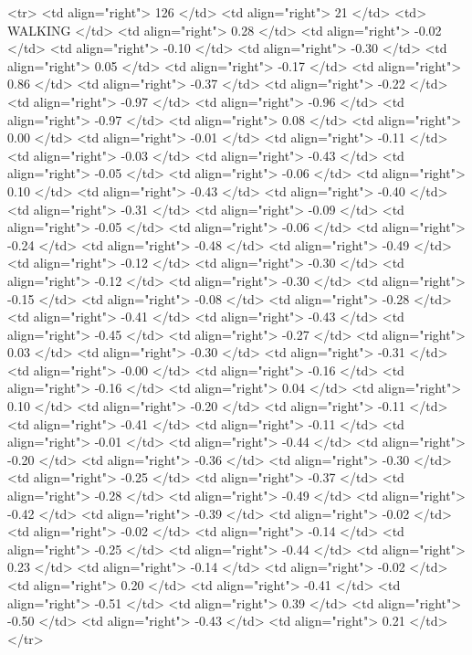   <tr> <td align="right"> 126 </td> <td align="right">  21 </td> <td> WALKING </td> <td align="right"> 0.28 </td> <td align="right"> -0.02 </td> <td align="right"> -0.10 </td> <td align="right"> -0.30 </td> <td align="right"> 0.05 </td> <td align="right"> -0.17 </td> <td align="right"> 0.86 </td> <td align="right"> -0.37 </td> <td align="right"> -0.22 </td> <td align="right"> -0.97 </td> <td align="right"> -0.96 </td> <td align="right"> -0.97 </td> <td align="right"> 0.08 </td> <td align="right"> 0.00 </td> <td align="right"> -0.01 </td> <td align="right"> -0.11 </td> <td align="right"> -0.03 </td> <td align="right"> -0.43 </td> <td align="right"> -0.05 </td> <td align="right"> -0.06 </td> <td align="right"> 0.10 </td> <td align="right"> -0.43 </td> <td align="right"> -0.40 </td> <td align="right"> -0.31 </td> <td align="right"> -0.09 </td> <td align="right"> -0.05 </td> <td align="right"> -0.06 </td> <td align="right"> -0.24 </td> <td align="right"> -0.48 </td> <td align="right"> -0.49 </td> <td align="right"> -0.12 </td> <td align="right"> -0.30 </td> <td align="right"> -0.12 </td> <td align="right"> -0.30 </td> <td align="right"> -0.15 </td> <td align="right"> -0.08 </td> <td align="right"> -0.28 </td> <td align="right"> -0.41 </td> <td align="right"> -0.43 </td> <td align="right"> -0.45 </td> <td align="right"> -0.27 </td> <td align="right"> 0.03 </td> <td align="right"> -0.30 </td> <td align="right"> -0.31 </td> <td align="right"> -0.00 </td> <td align="right"> -0.16 </td> <td align="right"> -0.16 </td> <td align="right"> 0.04 </td> <td align="right"> 0.10 </td> <td align="right"> -0.20 </td> <td align="right"> -0.11 </td> <td align="right"> -0.41 </td> <td align="right"> -0.11 </td> <td align="right"> -0.01 </td> <td align="right"> -0.44 </td> <td align="right"> -0.20 </td> <td align="right"> -0.36 </td> <td align="right"> -0.30 </td> <td align="right"> -0.25 </td> <td align="right"> -0.37 </td> <td align="right"> -0.28 </td> <td align="right"> -0.49 </td> <td align="right"> -0.42 </td> <td align="right"> -0.39 </td> <td align="right"> -0.02 </td> <td align="right"> -0.02 </td> <td align="right"> -0.14 </td> <td align="right"> -0.25 </td> <td align="right"> -0.44 </td> <td align="right"> 0.23 </td> <td align="right"> -0.14 </td> <td align="right"> -0.02 </td> <td align="right"> 0.20 </td> <td align="right"> -0.41 </td> <td align="right"> -0.51 </td> <td align="right"> 0.39 </td> <td align="right"> -0.50 </td> <td align="right"> -0.43 </td> <td align="right"> 0.21 </td> </tr>
